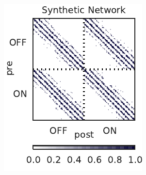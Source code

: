 \begin{figure}[t!]
\begin{subfigure}[b]{1.8in}
    \label{fig:synth_rgc_bfgs_conn}
  \end{subfigure} \\
  \begin{subfigure}[b]{1.8in}
    \centering
    \caption{}
    \vspace{-.25in}
    \includegraphics[width=\textwidth]{figures/ch3/synth_rgc_true_sparsity.pdf}
    \label{fig:synth_rgc_true_sparsity}
  \end{subfigure}
  ~
  \begin{subfigure}[b]{1.8in}
    \centering
    \caption{}
    \vspace{-.25in}

\end{subfigure}
\end{figure}
